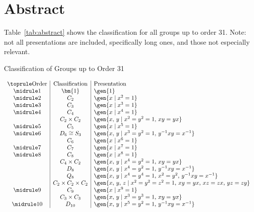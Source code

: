 \section{Abstract}
Table~\ref{tab:abstract} shows the classification for all groups up to order 31.
Note: not all presentations are included, specifically long ones, and those not especially relevant.

\begin{table}
    \caption{Classification of Groups up to Order 31}\label{tab:abstract}
    \begin{center}
        \begin{displaymath}
\begin{array}{c|c|l}
    \toprule
    \text{Order} & \text{Classification} & \text{Presentation} \\
    \midrule
    1 & \bm{1} & \gen{1} \\
    \midrule
    2 & C_2 & \gen{x \mid x^2 = 1} \\
    \midrule
    3 & C_3 & \gen{x \mid x^3 = 1} \\
    \midrule
    4 & C_4 & \gen{x \mid x^4 = 1} \\
      & C_2 \times C_2 & \gen{x,\,y \mid x^2 = y^2 = 1,\, xy = yx} \\
    \midrule
    5 & C_5 & \gen{x \mid x^5 = 1} \\
    \midrule
    6 & D_6 \cong S_3 & \gen{x,\,y \mid x^3 = y^2 = 1,\, y^{-1}xy = x^{-1}} \\
      & C_6 & \gen{x \mid x^6 = 1} \\
    \midrule
    7 & C_7 & \gen{x \mid x^7 = 1} \\
    \midrule
    8 & C_8 & \gen{x \mid x^8 = 1} \\
      & C_4 \times C_2 & \gen{x,\,y \mid x^4 = y^2 = 1,\, xy = yx} \\
      & D_8 & \gen{x,\,y \mid x^4 = y^2 = 1,\, y^{-1}xy = x^{-1}} \\
      & Q_8 & \gen{x,\,y \mid x^4 = y^4 = 1,\, x^2 = y^2,\, y^{-1}xy = x^{-1}} \\
      & C_2 \times C_2 \times C_2 & \gen{x,\,y,\,z \mid x^2 = y^2 = z^2 = 1,\, xy = yx,\, xz = zx,\, yz = zy} \\
    \midrule
    9 & C_9 & \gen{x \mid x^9 = 1} \\
      & C_3 \times C_3 & \gen{x,\,y \mid x^3 = y^3 = 1,\, xy = yx} \\
    \midrule
    10 & D_{10} & \gen{x,\,y \mid x^5 = y^2 = 1,\, y^{-1}xy = x^{-1}} \\

\end{array}
\end{displaymath}
\end{center}
\end{table}

